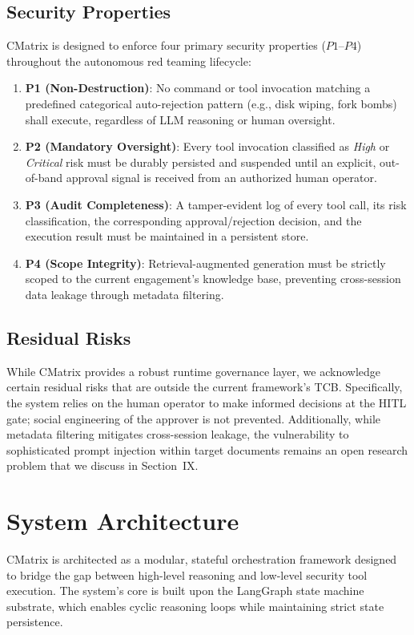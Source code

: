 \documentclass[conference,compsoc]{IEEEtran}
\begin{document}
\subsection{Security Properties}
CMatrix is designed to enforce four primary security properties ($P1$--$P4$) throughout the autonomous red teaming lifecycle:

\begin{enumerate}
    \item \textbf{P1 (Non-Destruction)}: No command or tool invocation matching a predefined categorical auto-rejection pattern (e.g., disk wiping, fork bombs) shall execute, regardless of LLM reasoning or human oversight.
    \item \textbf{P2 (Mandatory Oversight)}: Every tool invocation classified as \textit{High} or \textit{Critical} risk must be durably persisted and suspended until an explicit, out-of-band approval signal is received from an authorized human operator.
    \item \textbf{P3 (Audit Completeness)}: A tamper-evident log of every tool call, its risk classification, the corresponding approval/rejection decision, and the execution result must be maintained in a persistent store.
    \item \textbf{P4 (Scope Integrity)}: Retrieval-augmented generation must be strictly scoped to the current engagement's knowledge base, preventing cross-session data leakage through metadata filtering.
\end{enumerate}

\subsection{Residual Risks}
While CMatrix provides a robust runtime governance layer, we acknowledge certain residual risks that are outside the current framework's TCB. Specifically, the system relies on the human operator to make informed decisions at the HITL gate; social engineering of the approver is not prevented. Additionally, while metadata filtering mitigates cross-session leakage, the vulnerability to sophisticated prompt injection within target documents remains an open research problem that we discuss in Section~IX.

\section{System Architecture}
CMatrix is architected as a modular, stateful orchestration framework designed to bridge the gap between high-level reasoning and low-level security tool execution. The system's core is built upon the LangGraph state machine substrate, which enables cyclic reasoning loops while maintaining strict state persistence.
\end{document}
